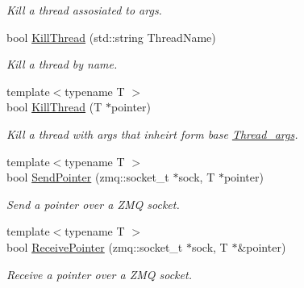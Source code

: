 \begin{DoxyCompactItemize}
\begin{DoxyCompactList}\small\item\em Kill a thread assosiated to args. \end{DoxyCompactList}\item 
\hypertarget{classUtilities_a8c17a46ce33b0b647797f24bc859bd7a}{bool \hyperlink{classUtilities_a8c17a46ce33b0b647797f24bc859bd7a}{Kill\-Thread} (std\-::string Thread\-Name)}\label{classUtilities_a8c17a46ce33b0b647797f24bc859bd7a}

\begin{DoxyCompactList}\small\item\em Kill a thread by name. \end{DoxyCompactList}\item 
\hypertarget{classUtilities_af4091a68d8a27a3b806d029cc9b2135e}{{\footnotesize template$<$typename T $>$ }\\bool \hyperlink{classUtilities_af4091a68d8a27a3b806d029cc9b2135e}{Kill\-Thread} (T $\ast$pointer)}\label{classUtilities_af4091a68d8a27a3b806d029cc9b2135e}

\begin{DoxyCompactList}\small\item\em Kill a thread with args that inheirt form base \hyperlink{structThread__args}{Thread\-\_\-args}. \end{DoxyCompactList}\item 
\hypertarget{classUtilities_aacc51726adc504475acc998002e85136}{{\footnotesize template$<$typename T $>$ }\\bool \hyperlink{classUtilities_aacc51726adc504475acc998002e85136}{Send\-Pointer} (zmq\-::socket\-\_\-t $\ast$sock, T $\ast$pointer)}\label{classUtilities_aacc51726adc504475acc998002e85136}

\begin{DoxyCompactList}\small\item\em Send a pointer over a Z\-M\-Q socket. \end{DoxyCompactList}\item 
\hypertarget{classUtilities_ad1c8ab61a339e46afca99d5951aae713}{{\footnotesize template$<$typename T $>$ }\\bool \hyperlink{classUtilities_ad1c8ab61a339e46afca99d5951aae713}{Receive\-Pointer} (zmq\-::socket\-\_\-t $\ast$sock, T $\ast$\&pointer)}\label{classUtilities_ad1c8ab61a339e46afca99d5951aae713}

\begin{DoxyCompactList}\small\item\em Receive a pointer over a Z\-M\-Q socket. \end{DoxyCompactList}\end{DoxyCompactItemize}


